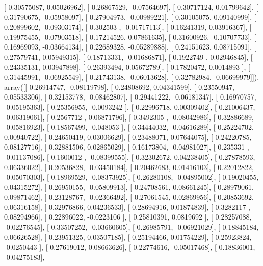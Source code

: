 \documentclass{article}
\begin{document}
       [ 0.30575087,  0.05026962],
       [ 0.26867529, -0.07564697],
       [ 0.30717124,  0.01799642],
       [ 0.31790675, -0.05958097],
       [ 0.27904973, -0.00989221],
       [ 0.30105075,  0.09140999],
       [ 0.20899602, -0.09303174],
       [ 0.302503  , -0.01717113],
       [ 0.16241319,  0.03916367],
       [ 0.19975455, -0.07903518],
       [ 0.17214526,  0.07861635],
       [ 0.31600926, -0.10707733],
       [ 0.16969093, -0.03664134],
       [ 0.22689328, -0.05289888],
       [ 0.24151623,  0.08715091],
       [ 0.27579741,  0.05949315],
       [ 0.18713331, -0.01686871],
       [ 0.1922749 ,  0.02946845],
       [ 0.24335131,  0.03947898],
       [ 0.26393494,  0.05672789],
       [ 0.17820472,  0.0014893 ],
       [ 0.31445991, -0.06925549],
       [ 0.21743138, -0.06013628],
       [ 0.32782984, -0.06699979]]), array([[ 0.26914747, -0.08119798],
       [ 0.24808692,  0.04341599],
       [ 0.23550947,  0.05533306],
       [ 0.32153778, -0.08462807],
       [ 0.29441222, -0.06181347],
       [ 0.16970757, -0.05195363],
       [ 0.25356955, -0.0093242 ],
       [ 0.22996718,  0.00309402],
       [ 0.21006437, -0.06319061],
       [ 0.2567712 ,  0.06871796],
       [ 0.3492305 , -0.08042986],
       [ 0.32886689, -0.05816923],
       [ 0.18567499, -0.048053  ],
       [ 0.34444032, -0.04616289],
       [ 0.25224702,  0.00940722],
       [ 0.24650419,  0.03006629],
       [ 0.23488071,  0.07644075],
       [ 0.24220785,  0.08127716],
       [ 0.32881506,  0.02865029],
       [ 0.16173804, -0.04981027],
       [ 0.235331  , -0.01137086],
       [ 0.1600012 , -0.08399555],
       [ 0.32302672,  0.04238405],
       [ 0.27878593,  0.06336022],
       [ 0.20536828, -0.03450184],
       [ 0.20462683,  0.01416103],
       [ 0.22012822, -0.05070303],
       [ 0.18969529, -0.08373925],
       [ 0.26280108, -0.04895002],
       [ 0.19020455,  0.04315272],
       [ 0.26950155, -0.05809913],
       [ 0.24708561,  0.08661245],
       [ 0.28979061,  0.09871462],
       [ 0.23128767, -0.02366492],
       [ 0.27061545,  0.02869956],
       [ 0.20853692,  0.06316158],
       [ 0.32976866,  0.04236533],
       [ 0.28694916,  0.01874839],
       [ 0.3282117 ,  0.08294966],
       [ 0.22896022, -0.0223106 ],
       [ 0.25810391,  0.0819692 ],
       [ 0.28257088, -0.02276545],
       [ 0.33507252, -0.03660605],
       [ 0.26985791, -0.06921029],
       [ 0.18845184,  0.06626528],
       [ 0.23951325,  0.03507185],
       [ 0.25194466,  0.01754229],
       [ 0.25923824, -0.0250443 ],
       [ 0.27619012,  0.08663626],
       [ 0.22774616, -0.05017468],
       [ 0.18836001, -0.04275183],
\end{document}
